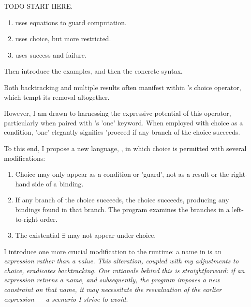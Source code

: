 \documentclass[manuscript,screen,review, 12pt, nonacm]{acmart}
\begin{document}
        TODO START HERE. 

        \begin{enumerate}
          \item \VMinus uses equations to guard computation. 
          \item \VMinus uses choice, but more restricted. 
          \item \VMinus uses success and failure. 
        \end{enumerate}
        
        Then introduce the examples, and then the concrete syntax. 

        Both backtracking and multiple results often manifest within \VC's
        choice operator, which tempt its removal altogether. 
        
        However, I am drawn
        to harnessing the expressive potential of this operator, particularly
        when paired with \VC's 'one' keyword. When employed with choice as a
        condition, 'one' elegantly signifies 'proceed if any branch of the
        choice succeeds. 
        
        To this end, I propose a new language, \VMinus, in which choice is
        permitted with several modifications:

        \begin{enumerate}
        \item Choice may only appear as a condition or 'guard', not as a result
        or the right-hand side of a binding.
        \item If any branch of the choice succeeds, the choice succeeds,
        producing any bindings found in that branch. The program examines the
        branches in a left-to-right order.
        \item The existential $\exists$ may not appear under choice.
        \end{enumerate}

        I introduce one more crucial modification to the \VC runtime: a name in
        \VMinus is an \it{expression} rather than a \it{value}. This alteration,
        coupled with my adjustments to choice, eradicates backtracking. Our
        rationale behind this is straightforward: if an expression returns a
        name, and subsequently, the program imposes a new constraint on that
        name, it may necessitate the reevaluation of the earlier expression—- a
        scenario I strive to avoid. 
        
\end{document}
